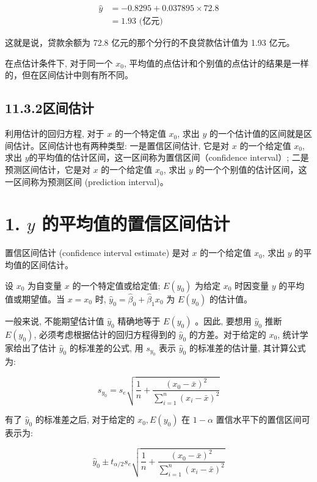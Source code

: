 \documentclass[10pt]{article}
\begin{document}
\begin{CJK*}{UTF8}{bsmi}
$$
\begin{aligned}
\hat{y} & =-0.8295+0.037895 \times 72.8 \\
& =1.93 \text { (亿元) }
\end{aligned}
$$

这就是说，贷款余额为 72.8 亿元的那个分行的不良贷款估计值为 1.93 亿元。

在点估计条件下, 对于同一个 $x_{0}$, 平均值的点估计和个别值的点估计的结果是一样的，但在区间估计中则有所不同。

\subsection*{11.3.2区间估计}
利用估计的回归方程, 对于 $x$ 的一个特定值 $x_{0}$, 求出 $y$ 的一个估计值的区间就是区间估计。区间估计也有两种类型: 一是置信区间估计, 它是对 $x$ 的一个给定值 $x_{0}$, 求出 $y$的平均值的估计区间，这一区间称为置信区间（confidence interval）; 二是预测区间估计，它是对 $x$ 的一个给定值 $x_{0}$, 求出 $y$ 的一个个别值的估计区间，这一区间称为预测区间 (prediction interval)。

\section*{1. $y$ 的平均值的置信区间估计}
置信区间估计 (confidence interval estimate) 是对 $x$ 的一个给定值 $x_{0}$, 求出 $y$ 的平均值的区间估计。

设 $x_{0}$ 为自变量 $x$ 的一个特定值或给定值; $E\left(y_{0}\right)$ 为给定 $x_{0}$ 时因变量 $y$ 的平均值或期望值。当 $x=x_{0}$ 时, $\hat{y}_{0}=\hat{\beta}_{0}+\hat{\beta}_{1} x_{0}$ 为 $E\left(y_{0}\right)$ 的估计值。

一般来说, 不能期望估计值 $\hat{y}_{0}$ 精确地等于 $E\left(y_{0}\right)$ 。因此, 要想用 $\hat{y}_{0}$ 推断 $E\left(y_{0}\right)$, 必须考虑根据估计的回归方程得到的 $\hat{y}_{0}$ 的方差。对于给定的 $x_{0}$, 统计学家给出了估计 $\hat{y}_{0}$ 的标准差的公式, 用 $s_{y_{0}}$ 表示 $\hat{y}_{0}$ 的标准差的估计量, 其计算公式为:


\begin{equation*}
s_{y_{0}}=s_{e} \sqrt{\frac{1}{n}+\frac{\left(x_{0}-\bar{x}\right)^{2}}{\sum_{i=1}^{n}\left(x_{i}-\bar{x}\right)^{2}}} \tag{11.22}
\end{equation*}


有了 $\hat{y}_{0}$ 的标准差之后, 对于给定的 $x_{0}, E\left(y_{0}\right)$ 在 $1-\alpha$ 置信水平下的置信区间可表示为:


\begin{equation*}
\hat{y}_{0} \pm t_{\alpha / 2} s_{e} \sqrt{\frac{1}{n}+\frac{\left(x_{0}-\bar{x}\right)^{2}}{\sum_{i=1}^{n}\left(x_{i}-\bar{x}\right)^{2}}} \tag{11.23}
\end{equation*}



\end{CJK*}
\end{document}
